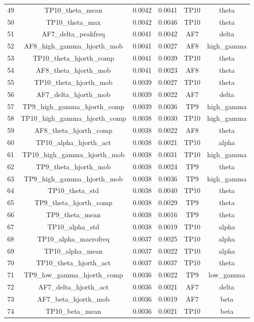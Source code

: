 \begin{table}[hptb]
\begin{table}
\begin{tabular}{cccccc}
49 & TP10_theta_mean & 0.0042 & 0.0041 & TP10 & theta \\
50 & TP10_theta_max & 0.0042 & 0.0046 & TP10 & theta \\
51 & AF7_delta_peakfreq & 0.0041 & 0.0042 & AF7 & delta \\
52 & AF8_high_gamma_hjorth_mob & 0.0041 & 0.0027 & AF8 & high_gamma \\
53 & TP10_theta_hjorth_comp & 0.0041 & 0.0039 & TP10 & theta \\
54 & AF8_theta_hjorth_mob & 0.0041 & 0.0023 & AF8 & theta \\
55 & TP10_theta_hjorth_mob & 0.0039 & 0.0027 & TP10 & theta \\
56 & AF7_delta_hjorth_mob & 0.0039 & 0.0022 & AF7 & delta \\
57 & TP9_high_gamma_hjorth_comp & 0.0039 & 0.0036 & TP9 & high_gamma \\
58 & TP10_high_gamma_hjorth_comp & 0.0038 & 0.0030 & TP10 & high_gamma \\
59 & AF8_theta_hjorth_comp & 0.0038 & 0.0022 & AF8 & theta \\
60 & TP10_alpha_hjorth_act & 0.0038 & 0.0021 & TP10 & alpha \\
61 & TP10_high_gamma_hjorth_mob & 0.0038 & 0.0031 & TP10 & high_gamma \\
62 & TP9_theta_hjorth_mob & 0.0038 & 0.0024 & TP9 & theta \\
63 & TP9_high_gamma_hjorth_mob & 0.0038 & 0.0036 & TP9 & high_gamma \\
64 & TP10_theta_std & 0.0038 & 0.0040 & TP10 & theta \\
65 & TP9_theta_hjorth_comp & 0.0038 & 0.0029 & TP9 & theta \\
66 & TP9_theta_mean & 0.0038 & 0.0016 & TP9 & theta \\
67 & TP10_alpha_std & 0.0038 & 0.0019 & TP10 & alpha \\
68 & TP10_alpha_macrofreq & 0.0037 & 0.0025 & TP10 & alpha \\
69 & TP10_alpha_mean & 0.0037 & 0.0022 & TP10 & alpha \\
70 & TP10_theta_hjorth_act & 0.0037 & 0.0037 & TP10 & theta \\
71 & TP9_low_gamma_hjorth_comp & 0.0036 & 0.0022 & TP9 & low_gamma \\
72 & AF7_delta_hjorth_act & 0.0036 & 0.0021 & AF7 & delta \\
73 & AF7_beta_hjorth_mob & 0.0036 & 0.0019 & AF7 & beta \\
74 & TP10_beta_mean & 0.0036 & 0.0021 & TP10 & beta \\

\end{tabular}
\end{table}
\end{table}
